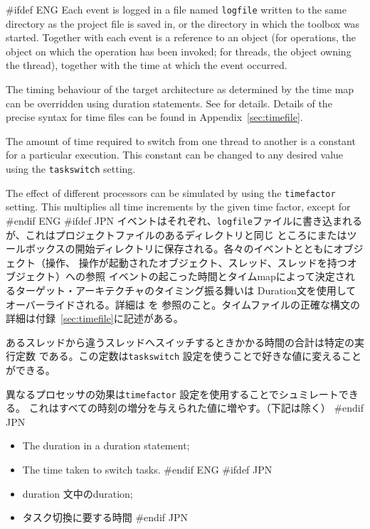 \documentclass[\pformat,12pt]{article}
\begin{document}
#ifdef ENG
Each event is logged in a file named \texttt{logfile} written to the
same directory as the project file is saved in, or the directory in
which the toolbox was started. Together with each event is a reference
to an object (for operations, the object on which the operation has
been invoked; for threads, the object owning the thread), together
with the time at which the event occurred.

The timing behaviour of the target architecture as determined by the
time map can be overridden using duration statements. See
\cite{LangManPP-SCSK} for details. Details of the precise syntax for time
files can be found in Appendix~\ref{sec:timefile}.

The amount of time required to switch from one thread to another is a
constant for a particular execution. This constant can be changed to
any desired value using the \texttt{taskswitch} setting.

The effect of different processors can be simulated by using the
\texttt{timefactor} setting. This multiplies all time increments by
the given time factor, except for
#endif ENG
#ifdef JPN
イベントはそれぞれ、\texttt{logfile}ファイルに書き込まれるが、これはプロジェクトファイルのあるディレクトリと同じ
ところにまたはツールボックスの開始ディレクトリに保存される。各々のイベントとともにオブジェクト（操作、
操作が起動されたオブジェクト、スレッド、スレッドを持つオブジェクト）への参照
イベントの起こった時間とタイムmapによって決定されるターゲット・アーキテクチャのタイミング振る舞いは
Duration文を使用してオーバーライドされる。詳細は\cite{LangManPP-SCSK} を
参照のこと。タイムファイルの正確な構文の詳細は付録~\ref{sec:timefile}に記述がある。

あるスレッドから違うスレッドへスイッチするときかかる時間の合計は特定の実行定数
である。この定数は\texttt{taskswitch} 設定を使うことで好きな値に変えることができる。

異なるプロセッサの効果は\texttt{timefactor} 設定を使用することでシュミレートできる。
これはすべての時刻の増分を与えられた値に増やす。（下記は除く）
#endif JPN

\begin{itemize}
#ifdef ENG
\item The duration in a duration statement;
\item The time taken to switch tasks.
#endif ENG
#ifdef JPN
\item duration 文中のduration;
\item タスク切換に要する時間
#endif JPN
\end{itemize}
\end{document}
